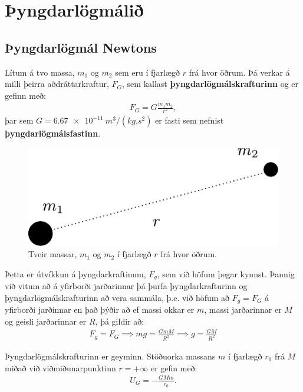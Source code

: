 

\chapter{Þyngdarlögmálið}

\section{Þyngdarlögmál Newtons}

\begin{tcolorbox}
\begin{definition}
Lítum á tvo massa, $m_1$ og $m_2$ sem eru í fjarlægð $r$ frá hvor öðrum. Þá verkar á milli þeirra aðdráttarkraftur, $F_G$, sem kallast \textbf{þyngdarlögmálskrafturinn} og er gefinn með:
\begin{align*}
    F_G = G \frac{m_1 m_2}{r^2},
\end{align*}
þar sem $G = \SI{6.67e-11}{m^3/(kg.s^2)}$ er fasti sem nefnist \textbf{þyngdarlögmálsfastinn}.
\end{definition}
\end{tcolorbox}

\begin{figure}[H]
    \centering
    \includegraphics[scale = 0.75]{figures/fG.pdf}
    \caption{Tveir massar, $m_1$ og $m_2$ í fjarlægð $r$ frá hvor öðrum.}
\end{figure}


Þetta er útvíkkun á þyngdarkraftinum, $F_g$, sem við höfum þegar kynnst. Þannig við vitum að á yfirborði jarðarinnar þá þurfa þyngdarkrafturinn og þyngdarlögmálskrafturinn að vera sammála, þ.e. við höfum að $F_g = F_G$ á yfirborði jarðinnar en það þýðir að ef massi okkar er $m$, massi jarðarinnar er $M$ og geisli jarðarinnar er $R$, þá gildir að:
\begin{align*}
    F_g = F_G \implies mg = \frac{GmM}{R^2} \implies g = \frac{GM}{R^2}
\end{align*}
\begin{tcolorbox}
\begin{theorem}
Þyngdarlögmálskrafturinn er geyminn. Stöðuorka massans $m$ í fjarlægð $r_0$ frá $M$ miðað við viðmiðunarpunktinn $r = +\infty$ er gefin með:
\begin{align*}
    U_G = -\frac{GM m}{r_0}.
\end{align*}
\end{theorem}
\end{tcolorbox}

